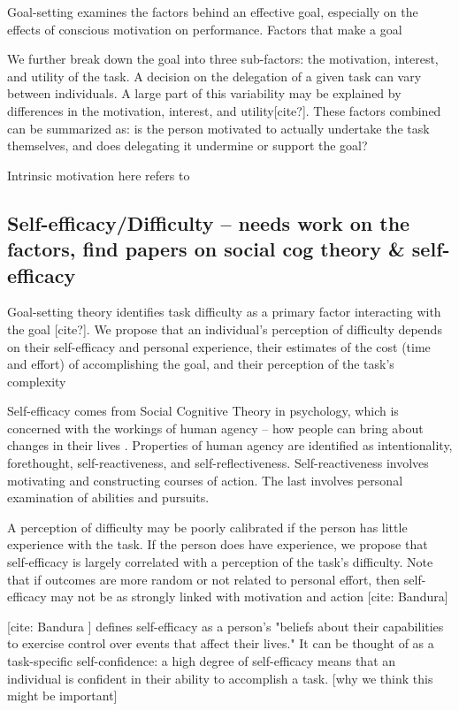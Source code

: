 \documentclass[letterpaper]{article} %
\begin{document}
Goal-setting examines the factors behind an effective goal, especially on the effects of conscious motivation on performance. Factors that make a goal 

We further break down the goal into three sub-factors: the motivation, interest, and utility of the task.
A decision on the delegation of a given task can vary between individuals. A large part of this variability may be explained by differences in the motivation, interest, and utility[cite?]. These factors combined can be summarized as: is the person motivated to actually undertake the task themselves, and does delegating it undermine or support the goal?

Intrinsic motivation here refers to 

\subsection{Self-efficacy/Difficulty -- needs work on the factors, find papers on social cog theory \& self-efficacy}
Goal-setting theory identifies task difficulty as a primary factor interacting with the goal [cite?]. We propose that an individual's perception of difficulty depends on their self-efficacy and personal experience, their estimates of the cost (time and effort) of accomplishing the goal, and their perception of the task's complexity

Self-efficacy comes from Social Cognitive Theory in psychology, which is concerned with the workings of human agency -- how people can bring about changes in their lives \cite{Bandura-agency}. Properties of human agency are identified as intentionality, forethought, self-reactiveness, and self-reflectiveness. Self-reactiveness involves motivating and constructing courses of action. The last involves personal examination of abilities and pursuits. 

A perception of difficulty may be poorly calibrated if the person has little experience with the task. If the person does have experience, we propose that self-efficacy is largely correlated with a perception of the task's difficulty. Note that if outcomes are more random or not related to personal effort, then self-efficacy may not be as strongly linked with motivation and action [cite: Bandura]

[cite: Bandura ] defines self-efficacy as a person's "beliefs about their capabilities to exercise control over events that affect their lives." It can be thought of as a task-specific self-confidence: a high degree of self-efficacy means that an individual is confident in their ability to accomplish a task. [why we think this might be important]
\end{document}
